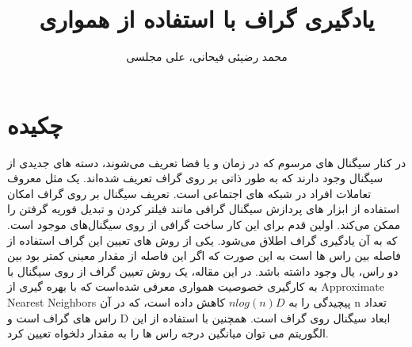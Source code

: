 \documentclass[10pt,twocolumn,a4paper]{article}
\title{یادگیری گراف با استفاده از همواری}
\author{
محمد رضیئی فیحانی،
علی مجلسی
}
\date{}
\begin{document}
%			
%			
%			
%			
%			
%			
%			
%			
%			
%			
%			
%			
%			
%			
%			
%			
%			
%			
%			
%			
%			
%			

	\maketitle
	
	\section*{چکیده}
 	\begin{strip}
 		در کنار سیگنال های مرسوم که در زمان و یا فضا تعریف می‌شوند، دسته های جدیدی از سیگنال وجود دارند که به طور ذاتی بر روی گراف تعریف شده‌اند. یک مثل معروف تعاملات افراد در شبکه های اجتماعی است. تعریف سیگنال بر روی گراف امکان استفاده از ابزار های پردازش سیگنال گرافی مانند فیلتر کردن و تبدیل فوریه گرفتن را ممکن می‌کند. اولین قدم برای این کار ساخت گرافی از روی سیگنال‌های موجود است. که به آن یادگیری گراف اطلاق می‌شود. یکی از روش های تعیین این گراف استفاده از فاصله بین راس ها است به این صورت که اگر این فاصله از مقدار معینی کمتر بود بین دو راس، یال وجود داشته باشد. در این مقاله، یک روش تعیین گراف از روی سیگنال با به کارگیری خصوصیت همواری معرفی شده‌است که با بهره گیری از Approximate Nearest Neighbors پیچیدگی را به
 		 $nlog(n)D$
 		  کاهش داده است، که در آن n تعداد راس های گراف است و D ابعاد سیگنال روی گراف است. همچنین با استفاده از این الگوریتم می توان میانگین درجه راس ها را به مقدار دلخواه تعیین کرد.
 	\end{strip}
	
\end{document}
